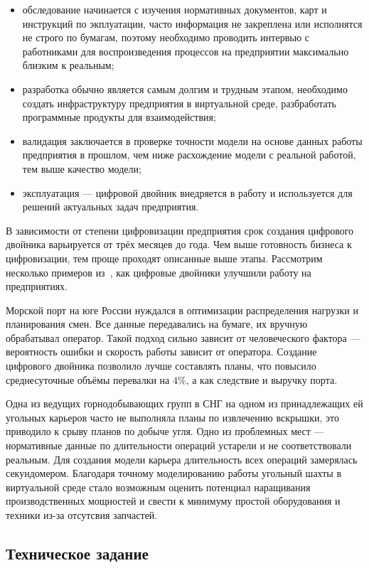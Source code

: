 \begin{itemize}
    \item обследование начинается с изучения нормативных документов, карт и инструкций по экплуатации, часто информация не закреплена или исполнятся не строго по бумагам, поэтому необходимо проводить интервью с работниками для воспроизведения процессов на предприятии максимально близким к реальным;
    \item разработка обычно является самым долгим и трудным этапом, необходимо создать инфраструктуру предприятия в виртуальной среде, разбработать программные продукты для взаимодействия;
    \item валидация заключается в проверке точности модели на основе данных работы предприятия в прошлом, чем ниже расхождение модели с реальной работой, тем выше качество модели;
    \item эксплуатация --- цифровой двойник внедряется в работу и используется для решений актуальных задач предприятия.
\end{itemize}

В зависимости от степени цифровизации предприятия срок создания цифрового двойника варьируется от трёх месяцев до года. Чем выше готовность бизнеса к цифровизации, тем проще проходят описанные выше этапы. Рассмотрим несколько примеров из~\cite{Habr1}, как цифровые двойники улучшили работу на предприятиях.

Морской порт на юге России нуждался в оптимизации распределения нагрузки и планирования смен. Все данные передавались на бумаге, их вручную обрабатывал оператор. Такой подход сильно зависит от человеческого фактора --- вероятность ошибки и скорость работы зависит от оператора. Создание цифрового двойника позволило лучше составлять планы, что повысило среднесуточные объёмы перевалки на $4\%$, а как следствие и выручку порта.

Одна из ведущих горнодобывающих групп в СНГ на одном из принадлежащих ей угольных карьеров часто не выполняла планы по извлечению вскрышки, это приводило к срыву планов по добыче угля. Одно из проблемных мест --- нормативные данные по длительности операций устарели и не соответствовали реальным. Для создания модели карьера длительность всех операций замерялась секундомером. Благодаря точному моделированию работы угольный шахты в виртуальной среде стало возможным оценить потенциал наращивания производственных мощностей и свести к минимуму простой оборудования и техники из-за отсутсвия запчастей.

\subsection{Техническое задание}

